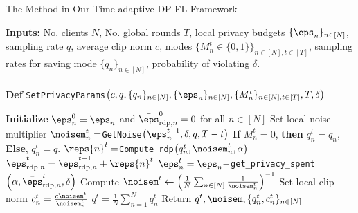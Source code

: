 

\begin{algorithm}[H]
\caption{The \algasgo Method in Our Time-adaptive DP-FL Framework}
\textbf{Inputs:} No. clients $N$, No. global rounds $T$, local privacy budgets $\{\eps_n\}_{n\in [N]}$, sampling rate $q$, average clip norm $c$, modes $\{M_n^t \in\{0,1\}\}_{n\in [N], t\in [T]}$, sampling rates for saving mode $\{q_n\}_{n\in [N]}$, probability of violating $\delta$. \\ \\ 
\label{alg:tidpfl:privacy}
\textbf{Def} \texttt{SetPrivacyParams}$\left(c, q,  \{q_n\}_{n\in [N]}, \{\eps_n\}_{n\in [N]}, \{M_n^t\}_{n\in [N], t\in [T]}, T, \delta\right)$
\begin{algorithmic}[1]
\State \textbf{Initialize} $\eps_n^0 = \eps_n$  and $\bar{\eps}_{\text{rdp},n}^0=0$
for all $n\in [N]$
\State Set local noise multiplier $\noisem_n^t=$\texttt{GetNoise}$\left(\eps_n^{t-1},\delta, q, T-t\right)$
\State \textbf{If} $M_n^t=0$, \textbf{then} $q_n^t = q_n$, \textbf{Else}, $q_n^t = q$.
\State $\reps{n}^t=$\texttt{Compute\_rdp}$\left(q_n^t,\noisem_n^t, \alpha\right)$
\State $\bar{\eps}_{\text{rdp},n}^t = \bar{\eps}_{\text{rdp},n}^{t-1} +  \reps{n}^t$
\State $\eps_n^t=\eps_n-$\texttt{get\_privacy\_spent}$\left(\alpha, \bar{\eps}_{\text{rdp},n}^t,\delta\right)$
\EndFor
\State Compute $\noisem^t \gets \left(\frac{1}{N}\sum_{n\in [N]}\frac{1}{\noisem_n^t}\right)^{-1}$
\State Set local clip norm $c_n^t=\frac{c\noisem^t}{\noisem_n^t}$
\EndFor
\EndFor
\State $q^t = \frac{1}{N} \sum_{n=1}^N q_n^t$
\State Return $q^t, \noisem, \{q_n^t, c_n^t\}_{n\in [N]}$
\end{algorithmic}
\end{algorithm}